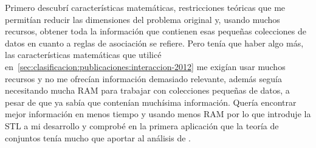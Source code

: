 Primero descubrí características matemáticas, restricciones teóricas que me permitían reducir las dimensiones del problema original y, usando muchos recursos, obtener toda la información que contienen esas pequeñas colecciones de datos en cuanto a reglas de asociación se refiere. Pero tenía que haber algo más, las características matemáticas que utilicé en~\ref{sec:clasificacion:publicaciones:interaccion-2012} me exigían usar muchos recursos y no me ofrecían información demasiado relevante, además seguía necesitando mucha RAM para trabajar con colecciones pequeñas de datos, a pesar de que ya sabía que contenían muchísima información. Quería encontrar mejor información en menos tiempo y usando menos RAM por lo que introduje la STL a mi desarrollo y comprobé en la primera aplicación que la teoría de conjuntos tenía mucho que aportar al análisis de \catalogos.
